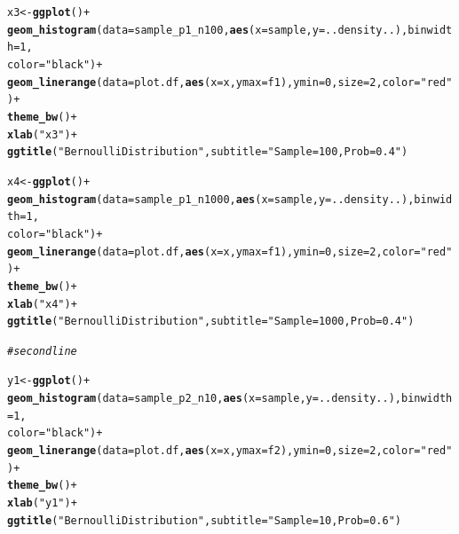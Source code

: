 \documentclass{article}\usepackage[]{graphicx}\usepackage[]{color}
\makeatletter
\newcommand{\hlnum}[1]{\textcolor[rgb]{0.686,0.059,0.569}{#1}}%
\newcommand{\hlstr}[1]{\textcolor[rgb]{0.192,0.494,0.8}{#1}}%
\newcommand{\hlcom}[1]{\textcolor[rgb]{0.678,0.584,0.686}{\textit{#1}}}%
\newcommand{\hlopt}[1]{\textcolor[rgb]{0,0,0}{#1}}%
\newcommand{\hlstd}[1]{\textcolor[rgb]{0.345,0.345,0.345}{#1}}%
\newcommand{\hlkwb}[1]{\textcolor[rgb]{0.69,0.353,0.396}{#1}}%
\newcommand{\hlkwc}[1]{\textcolor[rgb]{0.333,0.667,0.333}{#1}}%
\newcommand{\hlkwd}[1]{\textcolor[rgb]{0.737,0.353,0.396}{\textbf{#1}}}%
\newenvironment{kframe}{%
 \def\at@end@of@kframe{}%
 \ifinner\ifhmode%
  \def\at@end@of@kframe{\end{minipage}}%
  \begin{minipage}{\columnwidth}%
 \fi\fi%
 \def\FrameCommand##1{\hskip\@totalleftmargin \hskip-\fboxsep
 \colorbox{shadecolor}{##1}\hskip-\fboxsep
     \hskip-\linewidth \hskip-\@totalleftmargin \hskip\columnwidth}%
 \MakeFramed {\advance\hsize-\width
   \@totalleftmargin\z@ \linewidth\hsize
   \@setminipage}}%
 {\par\unskip\endMakeFramed%
 \at@end@of@kframe}
\newenvironment{knitrout}{}{} %
\makeatother
\begin{document}
\begin{enumerate}
\begin{enumerate}
\begin{knitrout}
\begin{kframe}
\begin{alltt}
                \hlstd{x3}\hlkwb{<-}\hlkwd{ggplot}\hlstd{()}\hlopt{+}
          \hlkwd{geom_histogram}\hlstd{(}\hlkwc{data} \hlstd{= sample_p1_n100,} \hlkwd{aes}\hlstd{(}\hlkwc{x} \hlstd{= sample,} \hlkwc{y}\hlstd{=..density..),} \hlkwc{binwidth}\hlstd{=}\hlnum{1}\hlstd{,}
                         \hlkwc{color}\hlstd{=}\hlstr{"black"}\hlstd{)}\hlopt{+}
          \hlkwd{geom_linerange}\hlstd{(}\hlkwc{data}\hlstd{=plot.df,} \hlkwd{aes}\hlstd{(}\hlkwc{x}\hlstd{=x,} \hlkwc{ymax} \hlstd{= f1),} \hlkwc{ymin} \hlstd{=} \hlnum{0}\hlstd{,} \hlkwc{size}\hlstd{=}\hlnum{2}\hlstd{,} \hlkwc{color}\hlstd{=}\hlstr{"red"}\hlstd{)}\hlopt{+}
          \hlkwd{theme_bw}\hlstd{()} \hlopt{+}
          \hlkwd{xlab}\hlstd{(}\hlstr{"x3"}\hlstd{)}\hlopt{+}
          \hlkwd{ggtitle}\hlstd{(}\hlstr{"Bernoulli Distribution"}\hlstd{,}\hlkwc{subtitle} \hlstd{=} \hlstr{"Sample = 100, Prob =0.4"}\hlstd{)}

                \hlstd{x4}\hlkwb{<-}\hlkwd{ggplot}\hlstd{()}\hlopt{+}
          \hlkwd{geom_histogram}\hlstd{(}\hlkwc{data} \hlstd{= sample_p1_n1000,} \hlkwd{aes}\hlstd{(}\hlkwc{x} \hlstd{= sample,} \hlkwc{y}\hlstd{=..density..),} \hlkwc{binwidth}\hlstd{=}\hlnum{1}\hlstd{,}
                         \hlkwc{color}\hlstd{=}\hlstr{"black"}\hlstd{)}\hlopt{+}
          \hlkwd{geom_linerange}\hlstd{(}\hlkwc{data}\hlstd{=plot.df,} \hlkwd{aes}\hlstd{(}\hlkwc{x}\hlstd{=x,} \hlkwc{ymax} \hlstd{= f1),} \hlkwc{ymin} \hlstd{=} \hlnum{0}\hlstd{,} \hlkwc{size}\hlstd{=}\hlnum{2}\hlstd{,} \hlkwc{color}\hlstd{=}\hlstr{"red"}\hlstd{)}\hlopt{+}
          \hlkwd{theme_bw}\hlstd{()} \hlopt{+}
          \hlkwd{xlab}\hlstd{(}\hlstr{"x4"}\hlstd{)}\hlopt{+}
          \hlkwd{ggtitle}\hlstd{(}\hlstr{"Bernoulli Distribution"}\hlstd{,}\hlkwc{subtitle} \hlstd{=} \hlstr{"Sample = 1000, Prob =0.4"}\hlstd{)}

\hlcom{#second line}

                \hlstd{y1}\hlkwb{<-}\hlkwd{ggplot}\hlstd{()}\hlopt{+}
          \hlkwd{geom_histogram}\hlstd{(}\hlkwc{data} \hlstd{= sample_p2_n10,} \hlkwd{aes}\hlstd{(}\hlkwc{x} \hlstd{= sample,} \hlkwc{y}\hlstd{=..density..),} \hlkwc{binwidth}\hlstd{=}\hlnum{1}\hlstd{,}
                         \hlkwc{color}\hlstd{=}\hlstr{"black"}\hlstd{)}\hlopt{+}
          \hlkwd{geom_linerange}\hlstd{(}\hlkwc{data}\hlstd{=plot.df,} \hlkwd{aes}\hlstd{(}\hlkwc{x}\hlstd{=x,} \hlkwc{ymax} \hlstd{= f2),} \hlkwc{ymin} \hlstd{=} \hlnum{0}\hlstd{,} \hlkwc{size}\hlstd{=}\hlnum{2}\hlstd{,} \hlkwc{color}\hlstd{=}\hlstr{"red"}\hlstd{)}\hlopt{+}
          \hlkwd{theme_bw}\hlstd{()} \hlopt{+}
          \hlkwd{xlab}\hlstd{(}\hlstr{"y1"}\hlstd{)}\hlopt{+}
          \hlkwd{ggtitle}\hlstd{(}\hlstr{"Bernoulli Distribution"}\hlstd{,}\hlkwc{subtitle} \hlstd{=} \hlstr{"Sample = 10, Prob =0.6"}\hlstd{)}


\end{alltt}
\end{kframe}
\end{knitrout}
\end{enumerate}
\end{enumerate}
\end{document}
